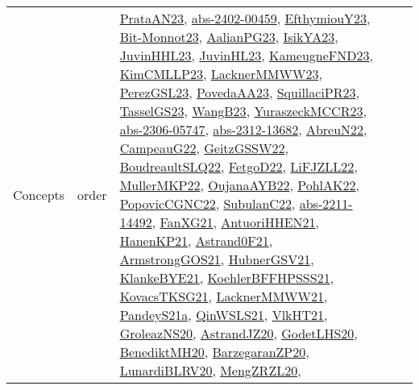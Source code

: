 {\begin{longtable}{lp{3cm}>{\raggedright}p{6cm}>{\raggedright}p{6cm}p{8cm}}
Concepts & order & \href{articles/PrataAN23.pdf}{PrataAN23}\cite{PrataAN23}, \href{articles/abs-2402-00459.pdf}{abs-2402-00459}\cite{abs-2402-00459}, \href{papers/EfthymiouY23.pdf}{EfthymiouY23}\cite{EfthymiouY23}, \href{papers/Bit-Monnot23.pdf}{Bit-Monnot23}\cite{Bit-Monnot23}, \href{papers/AalianPG23.pdf}{AalianPG23}\cite{AalianPG23}, \href{articles/IsikYA23.pdf}{IsikYA23}\cite{IsikYA23}, \href{papers/JuvinHHL23.pdf}{JuvinHHL23}\cite{JuvinHHL23}, \href{papers/JuvinHL23.pdf}{JuvinHL23}\cite{JuvinHL23}, \href{papers/KameugneFND23.pdf}{KameugneFND23}\cite{KameugneFND23}, \href{papers/KimCMLLP23.pdf}{KimCMLLP23}\cite{KimCMLLP23}, \href{articles/LacknerMMWW23.pdf}{LacknerMMWW23}\cite{LacknerMMWW23}, \href{papers/PerezGSL23.pdf}{PerezGSL23}\cite{PerezGSL23}, \href{papers/PovedaAA23.pdf}{PovedaAA23}\cite{PovedaAA23}, \href{papers/SquillaciPR23.pdf}{SquillaciPR23}\cite{SquillaciPR23}, \href{papers/TasselGS23.pdf}{TasselGS23}\cite{TasselGS23}, \href{papers/WangB23.pdf}{WangB23}\cite{WangB23}, \href{articles/YuraszeckMCCR23.pdf}{YuraszeckMCCR23}\cite{YuraszeckMCCR23}, \href{articles/abs-2306-05747.pdf}{abs-2306-05747}\cite{abs-2306-05747}, \href{articles/abs-2312-13682.pdf}{abs-2312-13682}\cite{abs-2312-13682}, \href{articles/AbreuN22.pdf}{AbreuN22}\cite{AbreuN22}, \href{articles/CampeauG22.pdf}{CampeauG22}\cite{CampeauG22}, \href{papers/GeitzGSSW22.pdf}{GeitzGSSW22}\cite{GeitzGSSW22}, \href{papers/BoudreaultSLQ22.pdf}{BoudreaultSLQ22}\cite{BoudreaultSLQ22}, \href{articles/FetgoD22.pdf}{FetgoD22}\cite{FetgoD22}, \href{papers/LiFJZLL22.pdf}{LiFJZLL22}\cite{LiFJZLL22}, \href{articles/MullerMKP22.pdf}{MullerMKP22}\cite{MullerMKP22}, \href{papers/OujanaAYB22.pdf}{OujanaAYB22}\cite{OujanaAYB22}, \href{articles/PohlAK22.pdf}{PohlAK22}\cite{PohlAK22}, \href{papers/PopovicCGNC22.pdf}{PopovicCGNC22}\cite{PopovicCGNC22}, \href{articles/SubulanC22.pdf}{SubulanC22}\cite{SubulanC22}, \href{articles/abs-2211-14492.pdf}{abs-2211-14492}\cite{abs-2211-14492}, \href{articles/FanXG21.pdf}{FanXG21}\cite{FanXG21}, \href{papers/AntuoriHHEN21.pdf}{AntuoriHHEN21}\cite{AntuoriHHEN21}, \href{papers/HanenKP21.pdf}{HanenKP21}\cite{HanenKP21}, \href{papers/Astrand0F21.pdf}{Astrand0F21}\cite{Astrand0F21}, \href{papers/ArmstrongGOS21.pdf}{ArmstrongGOS21}\cite{ArmstrongGOS21}, \href{articles/HubnerGSV21.pdf}{HubnerGSV21}\cite{HubnerGSV21}, \href{papers/KlankeBYE21.pdf}{KlankeBYE21}\cite{KlankeBYE21}, \href{articles/KoehlerBFFHPSSS21.pdf}{KoehlerBFFHPSSS21}\cite{KoehlerBFFHPSSS21}, \href{papers/KovacsTKSG21.pdf}{KovacsTKSG21}\cite{KovacsTKSG21}, \href{papers/LacknerMMWW21.pdf}{LacknerMMWW21}\cite{LacknerMMWW21}, \href{articles/PandeyS21a.pdf}{PandeyS21a}\cite{PandeyS21a}, \href{articles/QinWSLS21.pdf}{QinWSLS21}\cite{QinWSLS21}, \href{articles/VlkHT21.pdf}{VlkHT21}\cite{VlkHT21}, \href{papers/GroleazNS20.pdf}{GroleazNS20}\cite{GroleazNS20}, \href{articles/AstrandJZ20.pdf}{AstrandJZ20}\cite{AstrandJZ20}, \href{papers/GodetLHS20.pdf}{GodetLHS20}\cite{GodetLHS20}, \href{articles/BenediktMH20.pdf}{BenediktMH20}\cite{BenediktMH20}, \href{papers/BarzegaranZP20.pdf}{BarzegaranZP20}\cite{BarzegaranZP20}, \href{articles/LunardiBLRV20.pdf}{LunardiBLRV20}\cite{LunardiBLRV20}, \href{articles/MengZRZL20.pdf}{MengZRZL20}\cite{MengZRZL20}, 
\end{longtable}}
